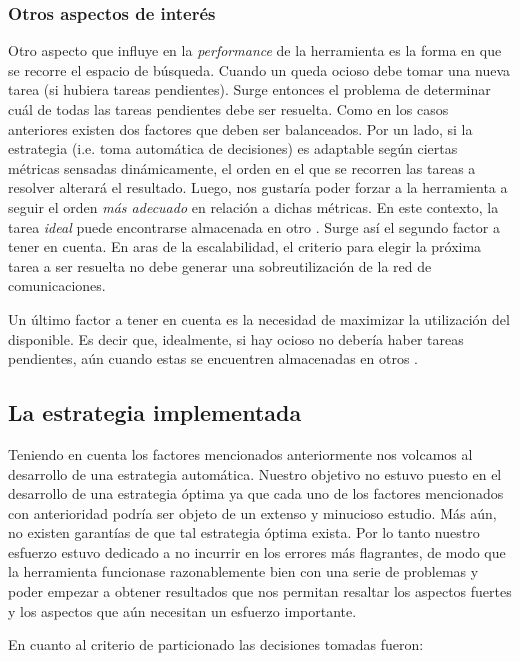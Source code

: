 \subsubsection{Otros aspectos de interés}

Otro aspecto que influye en la \emph{performance} de la herramienta es la
forma en que se recorre el espacio de búsqueda. Cuando un \w queda ocioso debe
tomar una nueva tarea (si hubiera tareas pendientes). Surge entonces el
problema de determinar cuál de todas las tareas pendientes debe ser resuelta.
Como en los casos anteriores existen dos factores que deben ser balanceados.
Por un lado, si la estrategia (i.e. toma automática de decisiones) es adaptable según ciertas métricas sensadas dinámicamente, el
orden en el que se recorren las tareas a resolver alterará el resultado. Luego, nos gustaría poder
forzar a la herramienta a seguir el orden \emph{más adecuado} en relación a dichas métricas. En este contexto, la tarea \emph{ideal} puede encontrarse
almacenada en otro \w. Surge así el segundo factor a tener en cuenta. En aras
de la escalabilidad, el criterio para elegir la próxima tarea a ser resuelta no
debe generar una sobreutilización de la red de comunicaciones.

Un último factor a tener en cuenta es la necesidad de maximizar la utilización
del \hard disponible. Es decir que, idealmente, si hay \hard ocioso no debería
haber tareas pendientes, aún cuando estas se encuentren almacenadas en otros \w.

\subsection{La estrategia implementada}
\label{estrategia:implementada}

Teniendo en cuenta los factores mencionados anteriormente nos volcamos al
desarrollo de una estrategia automática. Nuestro objetivo no estuvo puesto en
el desarrollo de una estrategia óptima ya que cada uno de los factores
mencionados con anterioridad podría ser objeto de un extenso y minucioso estudio. 
Más aún, no existen garantías de que tal estrategia óptima exista. Por lo tanto nuestro esfuerzo estuvo dedicado a no
incurrir en los errores más flagrantes, de modo que la herramienta funcionase
razonablemente bien con una serie de problemas y poder empezar a obtener
resultados que nos permitan resaltar los aspectos fuertes y los aspectos que
aún necesitan un esfuerzo importante.

En cuanto al criterio de particionado las decisiones tomadas fueron:

